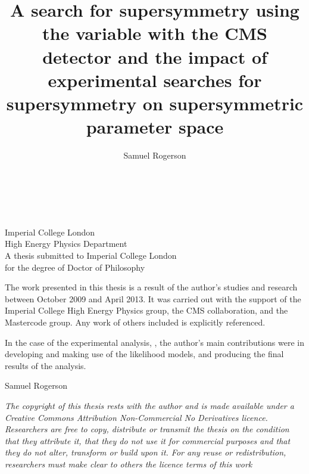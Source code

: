 \documentclass[]{mythesis}
\title{A search for supersymmetry using the \aT variable with the CMS detector
    and the impact of experimental searches for supersymmetry on supersymmetric
parameter space}
\author{Samuel Rogerson}
\begin{document}
    \thispagestyle{empty}%
    \begin{center}%
      \vspace*{2cm}%
      \begin{doublespace}%
        {\Huge\textbf{\thetitle}}\\%
      \end{doublespace}%
      \vspace*{3cm}%
      {\Large{{\theauthor} \\ {Imperial College London \\
        High Energy Physics Department}}}\\%
      \vspace*{6cm}%
      {A thesis submitted to Imperial College London \\ for the degree of
      Doctor of Philosophy}
    \end{center}%
    \clearpage

    \begin{declaration}
        The work presented in this thesis is a result of the author's studies
        and research between October 2009 and April 2013.  It was carried out
        with the support of the Imperial College High Energy Physics group, the
        CMS collaboration, and  the Mastercode group.  Any work of others
        included is explicitly referenced.

        In the case of the experimental analysis,
        , the author's main contributions were in
        developing and making use of the likelihood models, and producing the
        final results of the analysis.

        \vspace*{1cm}
        \begin{flushright}
            Samuel Rogerson
        \end{flushright}
        \vfill
        \emph{The copyright of this thesis rests with the author and is made
            available under a Creative Commons Attribution Non-Commercial No
            Derivatives licence. Researchers are free to copy, distribute or
            transmit the thesis on the condition that they attribute it, that
            they do not use it for commercial purposes and that they do not
            alter, transform or build upon it. For any reuse or redistribution,
        researchers must make clear to others the licence terms of this work}

    \end{declaration}
    
\end{document}

